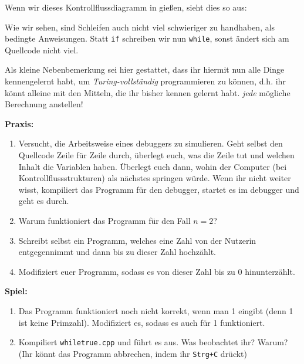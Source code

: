 Wenn wir dieses Kontrollflussdiagramm in \Cpp gießen, sieht dies so aus:

Wie wir sehen, sind Schleifen auch nicht viel schwieriger zu handhaben, als
bedingte Anweisungen. Statt \texttt{if} schreiben wir nun \texttt{while}, sonst
ändert sich am Quellcode nicht viel.

Als kleine Nebenbemerkung sei hier gestattet, dass ihr hiermit nun alle Dinge
kennengelernt habt, um \emph{Turing-vollständig} programmieren zu können, d.h.
ihr könnt alleine mit den Mitteln, die ihr bisher kennen gelernt habt.
\emph{jede} mögliche Berechnung anstellen!

\textbf{Praxis:}
\begin{enumerate}
    \item Versucht, die Arbeitsweise eines debuggers zu simulieren. Geht selbst
        den Quellcode Zeile für Zeile durch, überlegt euch, was die Zeile tut
        und welchen Inhalt die Variablen haben. Überlegt euch dann, wohin der
        Computer (bei Kontrollflussstrukturen) als nächstes springen würde.
        Wenn ihr nicht weiter wisst, kompiliert das Programm für den debugger,
        startet es im debugger und geht es durch.
    \item Warum funktioniert das Programm für den Fall $n = 2$?
    \item Schreibt selbst ein Programm, welches eine Zahl von der Nutzerin
        entgegennimmt und dann bis zu dieser Zahl hochzählt.
    \item Modifiziert euer Programm, sodass es von dieser Zahl bis zu 0
        hinunterzählt.
\end{enumerate}

\textbf{Spiel:}
\begin{enumerate}
    \item Das Programm funktioniert noch nicht korrekt, wenn man 1 eingibt
        (denn 1 ist keine Primzahl). Modifiziert es, sodass es auch für 1
        funktioniert.
    \item Kompiliert \texttt{whiletrue.cpp} und führt es aus. Was beobachtet
        ihr? Warum? (Ihr könnt das Programm abbrechen, indem ihr
        \texttt{Strg+C} drückt)
\end{enumerate}

